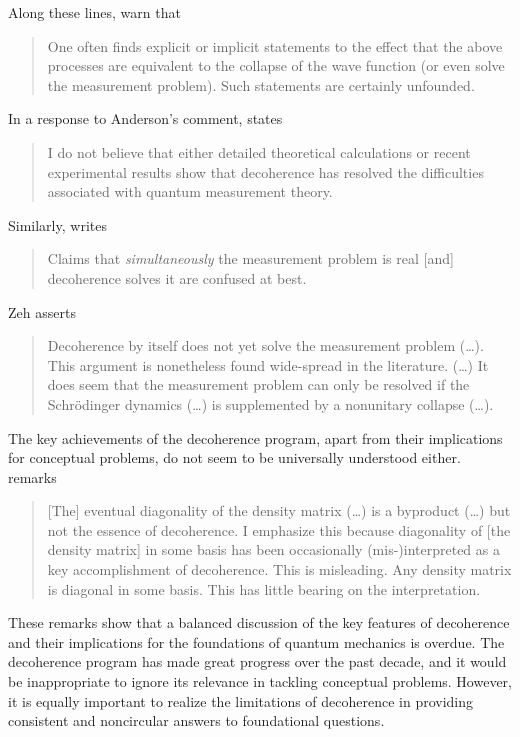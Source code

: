 \documentclass[twocolumn,rmp,aps,amsmath,amsfonts,noshowkeys,noshowpacs]{revtex4}
\begin{document}
%
Along these lines, \citet[p.~5]{Kiefer:1998:rz} warn that
%
\begin{quote} {\small 
    One often finds explicit or implicit statements
    to the effect that the above processes are equivalent to the
    collapse of the wave function (or even solve the measurement
    problem). Such statements are certainly unfounded.
}\end{quote}
%
In a response to Anderson's \citeyearpar[p.~492]{Anderson:2001:rc}
comment, \citet[p.~136]{Adler:2001:us} states
%
\begin{quote} {\small
  I do not believe that either detailed theoretical calculations or
  recent experimental results show that decoherence has resolved the
  difficulties associated with quantum measurement theory.
}\end{quote}
%
Similarly, \citet[p.~3]{Bacciagaluppi:2003:az} writes
%
\begin{quote} {\small 
  Claims that \emph{simultaneously} the measurement problem is real
  [and] decoherence solves it are confused at best.
}\end{quote}
%
Zeh asserts \cite[Ch.~2]{Joos:2003:jh}
%
\begin{quote} {\small
  Decoherence by itself does not yet solve the measurement
  problem (\dots). This argument is nonetheless found wide-spread in
  the literature. (\dots) It does seem that the measurement problem
  can only be resolved if the Schr\"odinger dynamics (\dots) is
  supplemented by a nonunitary collapse (\dots).
}\end{quote}
%
The key achievements of the decoherence program, apart from their
implications for conceptual problems, do not seem to be universally
understood either. \citet[p.~1800]{Zurek:1998:re} remarks
%
\begin{quote} {\small
  [The] eventual diagonality of the density matrix (\dots) is a
  byproduct (\dots) but not the essence of decoherence.  I emphasize
  this because diagonality of [the density matrix] in some basis has
  been occasionally (mis-)interpreted as a key accomplishment of
  decoherence. This is misleading. Any density matrix is diagonal in
  some basis. This has little bearing on the interpretation.
}\end{quote}
%
These remarks show that a balanced discussion of the key features of
decoherence and their implications for the foundations of quantum
mechanics is overdue. The decoherence program has made great progress
over the past decade, and it would be inappropriate to ignore its
relevance in tackling conceptual problems. However, it is equally
important to realize the limitations of decoherence in providing
consistent and noncircular answers to foundational questions.
\end{document}
